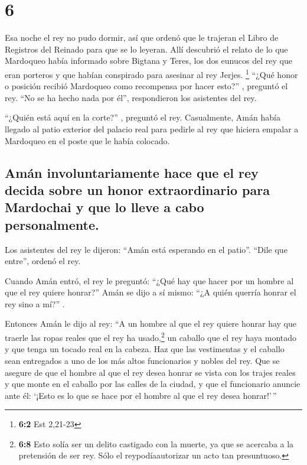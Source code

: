 \hypertarget{section-5}{%
\section{6}\label{section-5}}

 Esa noche el rey no pudo dormir, así que ordenó que le
trajeran el Libro de Registros del Reinado para que se lo leyeran.
 Allí descubrió el relato de lo que Mardoqueo había
informado sobre Bigtana y Teres, los dos eunucos del rey que eran
porteros y que habían conspirado para asesinar al rey Jerjes.
\footnote{\textbf{6:2} Est 2,21-23}  ``¿Qué honor o
posición recibió Mardoqueo como recompensa por hacer esto?'' , preguntó
el rey. ``No se ha hecho nada por él'', respondieron los asistentes del
rey.

 ``¿Quién está aquí en la corte?'' , preguntó el rey.
Casualmente, Amán había llegado al patio exterior del palacio real para
pedirle al rey que hiciera empalar a Mardoqueo en el poste que le había
colocado.

\hypertarget{amuxe1n-involuntariamente-hace-que-el-rey-decida-sobre-un-honor-extraordinario-para-mardochai-y-que-lo-lleve-a-cabo-personalmente.}{%
\subsection{Amán involuntariamente hace que el rey decida sobre un honor
extraordinario para Mardochai y que lo lleve a cabo
personalmente.}\label{amuxe1n-involuntariamente-hace-que-el-rey-decida-sobre-un-honor-extraordinario-para-mardochai-y-que-lo-lleve-a-cabo-personalmente.}}

 Los asistentes del rey le dijeron: ``Amán está esperando
en el patio''. ``Dile que entre'', ordenó el rey.

 Cuando Amán entró, el rey le preguntó: ``¿Qué hay que
hacer por un hombre al que el rey quiere honrar?'' Amán se dijo a sí
mismo: ``¿A quién querría honrar el rey sino a mí?'' .

 Entonces Amán le dijo al rey: ``A un hombre al que el rey
quiere honrar  hay que traerle las ropas reales que el rey
ha usado,\footnote{\textbf{6:8} Esto solía ser un delito castigado con
  la muerte, ya que se acercaba a la pretensión de ser rey. Sólo el
  reypodíaautorizar un acto tan presuntuoso.} un caballo que el rey haya
montado y que tenga un tocado real en la cabeza.  Haz que
las vestimentas y el caballo sean entregados a uno de los más altos
funcionarios y nobles del rey. Que se asegure de que el hombre al que el
rey desea honrar se vista con los trajes reales y que monte en el
caballo por las calles de la ciudad, y que el funcionario anuncie ante
él: `¡Esto es lo que se hace por el hombre al que el rey desea
honrar!'\,''

